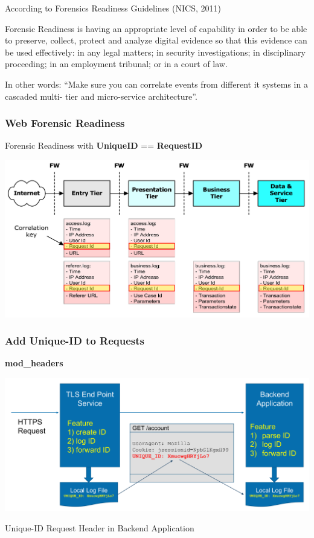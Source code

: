 According to Forensics Readiness Guidelines (NICS, 2011)

Forensic Readiness is having an appropriate level of capability in order to be able to preserve, collect, protect and analyze digital evidence so that this evidence can be used effectively: in any legal matters; in security investigations; in disciplinary proceeding; in an employment tribunal; or in a court of law.

In other words: “Make sure you can correlate events from different it systems in a cascaded multi- tier and micro-service architecture”.

\subsubsection{Web Forensic Readiness}
Forensic Readiness with \textbf{UniqueID} == \textbf{RequestID}
\begin{center}
  \includegraphics[width=\textwidth]{resources/12-forensic-readiness-1.png}
\end{center}

\subsubsection{Add Unique-ID to Requests}
\textbf{mod\_headers}

\begin{table}[h]
  \centering
  \includegraphics[width=\textwidth]{resources/12-unique-id-request-header.png}
  \caption{Unique-ID Request Header in Backend Application}
\end{table}

